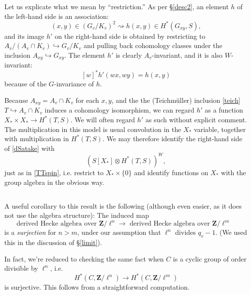 \documentclass[10pt]{amsart}
\newcommand{\Z}{\mathbf{Z}}
\theoremstyle{remark}
\begin{document}
  Let us explicate what we mean by ``restriction.''
As per \S \ref{desc2}, an  element $h$ of the left-hand side  is an association:
$$ (x,y) \in (G_v/K_v)^2 \rightsquigarrow h(x,y) \in H^*(G_{xy}, S),$$
and  its image  $h'$ on the right-hand side is obtained
  by restricting to $A_v/(A_v \cap K_v) \hookrightarrow G_v/K_v$
  and pulling back cohomology classes under the inclusion $A_{xy} \hookrightarrow G_{xy}$. 
  The element $h'$ is clearly $A_v$-invariant, and it is also $W$-invariant:
  $$  [w]^* h'(wx, wy) =   h(x,y)$$
because of the $G$-invariance of $h$. 
 
Because $A_{xy} = A_v \cap K_v$ for each $x,y$, and the  the (Teichm{\"u}ller) inclusion \eqref{teich}
$T \hookrightarrow A_v \cap K_v$ induces a cohomology isomorphism,
we can regard $h'$  as a function $X_* \times X_* \longrightarrow H^*(T,S)$.
We will often regard $h'$ as such without explicit comment.  
The multiplication in this model is usual convolution in the $X_*$ variable, together with multiplication in $H^*(T, S)$. 
 We may therefore identify the right-hand side of \eqref{dSatake} with   \begin{equation}  \label{alterpres} \left( S[X_*] \otimes H^*(T, S) \right)^W,\end{equation}
  just as in \eqref{TTspin}, i.e. restrict to $X_* \times \{0\}$ and identify functions on $X_*$ with the group algebra in the obvious way.
  
    \subsection{} \label{surj}
  
  A useful corollary to this result is the following (although even easier, as it does not use the algebra structure):
  The induced map
$$\mbox{derived Hecke algebra  over $\Z/\ell^n$} \rightarrow \mbox{ derived Hecke algebra  over  $\Z/\ell^m$ }$$
  is a {\em surjection} for $n > m$, under our assumption that $\ell^n$ divides $q_v-1$. 
  (We used this in the discussion  of \S \ref{limit}). 
  
  In fact, we're reduced to checking the same fact when $C$ is a cyclic group of order divisible by $\ell^n$, i.e.
  $$H^*(C, \Z/\ell^n) \rightarrow H^*(C, \Z/\ell^m)$$
  is surjective.  This follows from a straightforward computation.
  
  
    
%
%
%
%
%
%
%
%
%
%
%
%
%
%
%
%
\end{document}

